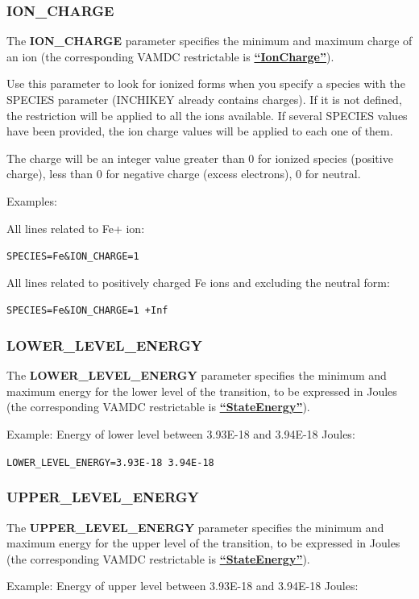 \documentclass[11pt,a4paper]{ivoa}
\def\vamdcres#1{\href{https://dictionary.vamdc.eu/restrictables/\##1}{\textbf{``\color{vamdccolor}#1''}}}
\newcommand{\parexample}[1]{\noindent\quad\texttt{#1}}
\begin{document}
\subsubsection{ION\_CHARGE}

The \textbf{ION\_CHARGE} parameter specifies the minimum and maximum charge
of an ion (the corresponding VAMDC restrictable is \vamdcres{IonCharge}).

Use this parameter to look for ionized forms when you specify a species
with the SPECIES
parameter (INCHIKEY already contains charges). If it is not defined, the restriction will be applied to all
the ions available. If several SPECIES values have been
provided, the ion charge values will be applied to each one of them.

The charge will be an integer value greater than 0 for ionized species
(positive charge), less than 0 for negative charge (excess electrons), 0
for neutral.

Examples:

All lines related to Fe+ ion:

\parexample{SPECIES=Fe\&ION\_CHARGE=1}

All lines related to positively charged Fe ions and excluding the neutral form:

\parexample{SPECIES=Fe\&ION\_CHARGE=1 +Inf}

\subsubsection{LOWER\_LEVEL\_ENERGY}

The \textbf{LOWER\_LEVEL\_ENERGY} parameter specifies the minimum and maximum energy for the lower level of the transition,
to be expressed in Joules (the corresponding VAMDC restrictable is \vamdcres{StateEnergy}).

Example: Energy of lower level between 3.93E-18 and 3.94E-18 Joules:

\parexample{LOWER\_LEVEL\_ENERGY=3.93E-18 3.94E-18}

\subsubsection{UPPER\_LEVEL\_ENERGY}

The \textbf{UPPER\_LEVEL\_ENERGY} parameter specifies the minimum
and maximum energy for the upper level of the transition, to be expressed in Joules
(the corresponding VAMDC restrictable is \vamdcres{StateEnergy}).

Example: Energy of upper level between 3.93E-18 and 3.94E-18 Joules:
\end{document}
